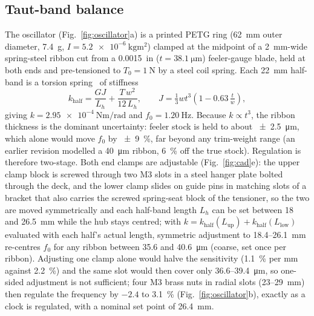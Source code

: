 \documentclass[11pt,a4paper]{article}
\begin{document}
\subsection{Taut-band balance}
The oscillator (Fig.~\ref{fig:oscillator}a) is a printed PETG ring (\SI{62}{\milli\metre} outer diameter, \SI{7.4}{\gram}, $I = \SI{5.2e-6}{\kilo\gram\metre\squared}$) clamped at the midpoint of a \SI{2}{\milli\metre}-wide spring-steel ribbon cut from a \SI{0.0015}{in} ($t = \SI{38.1}{\micro\metre}$) feeler-gauge blade, held at both ends and pre-tensioned to $T_0 = \SI{1}{\newton}$ by a steel coil spring. Each \SI{22}{\milli\metre} half-band is a torsion spring~\cite{timoshenko} of stiffness
\begin{equation}
k_{\mathrm{half}} = \frac{G J}{L_h} + \frac{T\,w^2}{12\,L_h}, \qquad J = \tfrac{1}{3} w t^3 \left(1 - 0.63\,\tfrac{t}{w}\right),
\end{equation}
giving $k = \SI{2.95e-4}{\newton\metre\per\radian}$ and $f_0 = \SI{1.20}{\hertz}$. Because $k \propto t^3$, the ribbon thickness is the dominant uncertainty: feeler stock is held to about \SI{\pm 2.5}{\micro\metre}, which alone would move $f_0$ by \SI{\pm 9}{\percent}, far beyond any trim-weight range (an earlier revision modelled a \SI{40}{\micro\metre} ribbon, \SI{6}{\percent} off the true stock). Regulation is therefore two-stage. Both end clamps are adjustable (Fig.~\ref{fig:cad}e): the upper clamp block is screwed through two M3 slots in a steel hanger plate bolted through the deck, and the lower clamp slides on guide pins in matching slots of a bracket that also carries the screwed spring-seat block of the tensioner, so the two are moved symmetrically and each half-band length $L_h$ can be set between 18 and \SI{26.5}{\milli\metre} while the hub stays centred; with $k = k_{\mathrm{half}}(L_{\mathrm{up}}) + k_{\mathrm{half}}(L_{\mathrm{low}})$ evaluated with each half's actual length, symmetric adjustment to 18.4--\SI{26.1}{\milli\metre} re-centres $f_0$ for any ribbon between 35.6 and \SI{40.6}{\micro\metre} (coarse, set once per ribbon). Adjusting one clamp alone would halve the sensitivity (\SI{1.1}{\percent} per mm against \SI{2.2}{\percent}) and the same slot would then cover only 36.6--\SI{39.4}{\micro\metre}, so one-sided adjustment is not sufficient; four M3 brass nuts in radial slots (23--\SI{29}{\milli\metre}) then regulate the frequency by $-2.4$ to \SI{+3.1}{\percent} (Fig.~\ref{fig:oscillator}b), exactly as a clock is regulated, with a nominal set point of \SI{26.4}{\milli\metre}.
\end{document}
